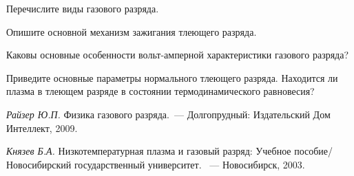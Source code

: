 

\begin{lab:questions}
 \item Перечислите виды газового разряда.
 
 \item Опишите основной механизм зажигания тлеющего разряда.
 
 \item Каковы основные особенности вольт-амперной характеристики газового разряда?
 
  \item Приведите основные параметры нормального тлеющего разряда. Находится
 ли плазма в тлеющем разряде в состоянии термодинамического равновесия?
  
\end{lab:questions}

\begin{lab:literature}
   \item \textit{Райзер Ю.П.} Физика газового разряда.~--- Долгопрудный: Издательский
   Дом Интеллект, 2009.
   
   \item \textit{Князев Б.А.} Низкотемпературная плазма и газовый разряд: Учебное
   пособие/ Новосибирский государственный университет. ~--- Новосибирск, 2003.
\end{lab:literature}

\endgroup %

